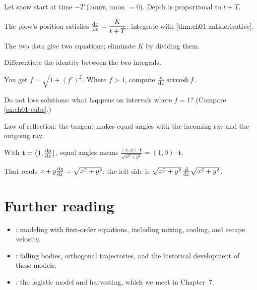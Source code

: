\begin{hintlevels}
  \item Let snow start at time $-T$ (hours, noon $= 0$). Depth is
        proportional to $t + T$.
  \item The plow's position satisfies $\frac{\mathrm{d}x}{\mathrm{d}t} = \dfrac{K}{t+T}$; integrate
        with \cref{thm:ch01-antiderivative}.
  \item The two data give two equations; eliminate $K$ by dividing them.
\end{hintlevels}

\begin{hintlevels}
  \item Differentiate the identity between the two integrals.
  \item You get $f = \sqrt{1 + (f')^2}$. Where $f>1$, compute
        $\frac{\mathrm{d}}{\mathrm{d}x}\operatorname{arccosh} f$.
  \item Do not lose solutions: what happens on intervals where $f = 1$?
        (Compare \cref{ex:ch01-cube}.)
\end{hintlevels}

\begin{hintlevels}
  \item Law of reflection: the tangent makes equal angles with the incoming
        ray and the outgoing ray.
  \item With $\mathbf{t} = \bigl(1, \frac{\mathrm{d}y}{\mathrm{d}x}\bigr)$, equal angles means
        $\frac{(x,y)\cdot\mathbf t}{\sqrt{x^2+y^2}} = (1,0)\cdot\mathbf t$.
  \item That reads $x + y\frac{\mathrm{d}y}{\mathrm{d}x} = \sqrt{x^2+y^2}$; the left side is
        $\sqrt{x^2+y^2}\,\frac{\mathrm{d}}{\mathrm{d}x}\sqrt{x^2+y^2}$.
\end{hintlevels}

\section{Further reading}\label{sec:ch02-reading}

\begin{itemize}
  \item \textcite[\S2.3]{BoyceDiPrima}: modeling with first-order equations,
        including mixing, cooling, and escape velocity.
  \item \textcite[Ch.~1 and Ch.~2]{Simmons}: falling bodies, orthogonal
        trajectories, and the historical development of these models.
  \item \textcite[\S1.1--1.3]{HSD}: the logistic model and harvesting, which
        we meet in Chapter~7.
\end{itemize}
